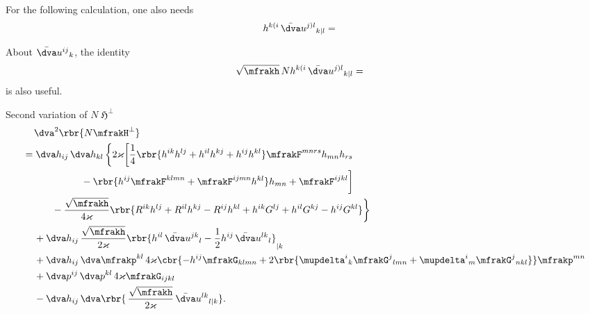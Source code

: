 \documentclass[a4paper,11pt]{article}
\begin{document}
For the following calculation, one also needs
\begin{align}
h^{k(i}\,\bar{\dva}u^{j)l}{}_{k|l} &=
\end{align}



About $\bar{\dva}u^{ij}{}_{k}$, the identity
\begin{align}
&
\sqrt{\mfrakh}\,N h^{k(i}\,\bar{\dva}u^{j)l}{}_{k|l} =
\end{align}
is also useful.


Second variation of $N \mfrakH^\perp$
\begin{align}
&\quad\,
\dva^2\rbr{N \mfrakH^\perp}
\nonumber \\
&= \dva h_{ij}\,\dva h_{kl}\,\bigg\{ 2\varkappa\bigg[
\frac{1}{4}\rbr{h^{ik}h^{lj}+h^{il}h^{kj}+h^{ij}h^{kl}} \mfrakF^{mnrs} 
h_{mn} h_{rs}
\nonumber \\
&\qquad\qquad\qquad
-\rbr{h^{ij}\mfrakF^{klmn}+\mfrakF^{ijmn}h^{kl}}h_{mn}
+\mfrakF^{ijkl} \bigg]
\nonumber \\
&\qquad\quad
-\frac{\sqrt{\mfrakh}}{4\varkappa}\rbr{
R^{ik}h^{lj}+R^{il}h^{kj}-R^{ij}h^{kl}+h^{ik}G^{lj}+h^{il}G^{kj}-h^{ij}G^{kl}}
\bigg\}
\nonumber \\
&\quad\,
+\dva h_{ij}\,\frac{\sqrt{\mfrakh}}{2\varkappa}
\rbr{h^{il}\,\bar{\dva}u^{jk}{}_{l}
- \frac{1}{2}h^{ij}\,\bar{\dva}u^{lk}{}_{l}}_{|k} 
\nonumber \\
&\quad\,
+\dva h_{ij}\,\dva \mfrakp^{kl}\,4\varkappa
\cbr{-h^{ij}\mfrakG_{klmn}+2\rbr{\mupdelta^i{}_k\mfrakG^{j}{}_{lmn} 
+\mupdelta^i{}_m\mfrakG^{j}{}_{nkl}} } \mfrakp^{mn}
\nonumber \\
&\quad\,
+\dva p^{ij}\,\dva p^{kl}\,4\varkappa \mfrakG_{ijkl}
\nonumber \\
&\quad\,
-\dva h_{ij}\,
\dva\rbr{\,\frac{\sqrt{\mfrakh}}{2\varkappa}\,\bar{\dva}u^{lk}{}_{l|k}}.
\end{align}
\end{document}
